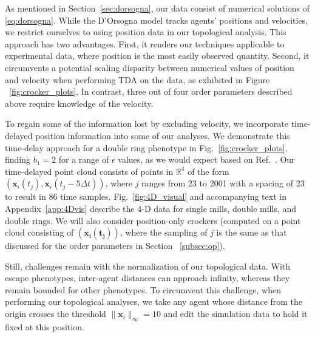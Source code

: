 \documentclass[%
 aip,
reprint,
 amsmath,amssymb,
 aps,
showkeys
]{revtex4-1}
\begin{document}
As mentioned in Section~\ref{sec:dorsogna}, our data consist of numerical solutions of \eqref{eq:dorsogna}. While the D'Orsogna model tracks agents' positions and velocities, we restrict ourselves to using position data in our topological analysis. This approach has two advantages. First, it renders our techniques applicable to experimental data, where position is the most easily observed quantity. Second, it circumvents a potential scaling disparity between numerical values of position and velocity when performing TDA on the data, as exhibited in Figure ~\ref{fig:crocker_plots}. In contrast, three out of four order parameters described above require knowledge of the velocity.

To regain some of the information lost by excluding velocity, we incorporate time-delayed position information into some of our analyses. We demonstrate this time-delay approach for a double ring phenotype in Fig.~\ref{fig:crocker_plots}, finding $b_1=2$ for a range of $\epsilon$ values, as we would expect based on Ref.~. Our time-delayed point cloud consists of points in $\mathbb{R}^4$ of the form $(\boldsymbol{x}_i(t_j), \boldsymbol{x}_i(t_j-5\Delta t))$, where $j$ ranges from 23 to 2001 with a spacing of 23 to result in 86 time samples.  Fig.~\ref{fig:4D_visual} and accompanying text in Appendix~\ref{app:4Dvis} describe the 4-D data for single mills, double mills, and double rings. We will also consider position-only crockers (computed on a point cloud consisting of $(\boldsymbol{x_i(t_j)})$, where the sampling of $j$ is the same as that discussed for the order parameters in Section ~\ref{subsec:op}).

Still, challenges remain with the normalization of our topological data. With escape phenotypes, inter-agent distances can approach infinity, whereas they remain bounded for other phenotypes. To circumvent this challenge, when performing our topological analyses, we take any agent whose distance from the origin crosses the threshold $\|\boldsymbol{x}_i\|_\infty = 10$ and edit the simulation data to hold it fixed at this position.
\end{document}
